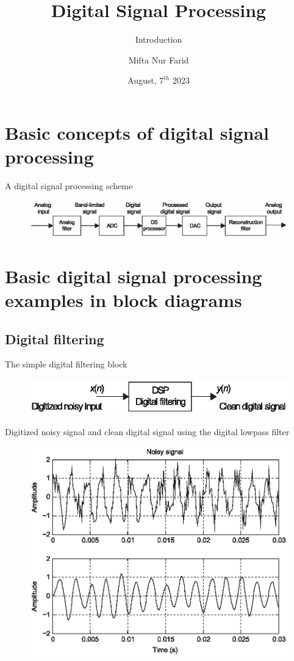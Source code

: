 \documentclass[pdflatex,compress,mathserif]{beamer}
\title{Digital Signal Processing}
\subtitle{Introduction}
\date{August, $7^{th}$ 2023}
\author{Mifta Nur Farid}
\begin{document}
\maketitle

\section{Basic concepts of digital signal processing}

\begin{frame}{A digital signal processing scheme}
	\begin{figure}
		\includegraphics[width=\linewidth]{img/img01}
	\end{figure}
\end{frame}

\section{Basic digital signal processing examples in block diagrams}

\subsection{Digital filtering}

\begin{frame}{The simple digital filtering block}
	\begin{figure}
		\includegraphics[width=\linewidth]{img/img02}
	\end{figure}
\end{frame}

\begin{frame}{Digitized noisy signal and clean digital signal using the digital lowpass filter}
	\begin{figure}
		\includegraphics[width=0.8\linewidth]{img/img03}
	\end{figure}
\end{frame}
\end{document}
